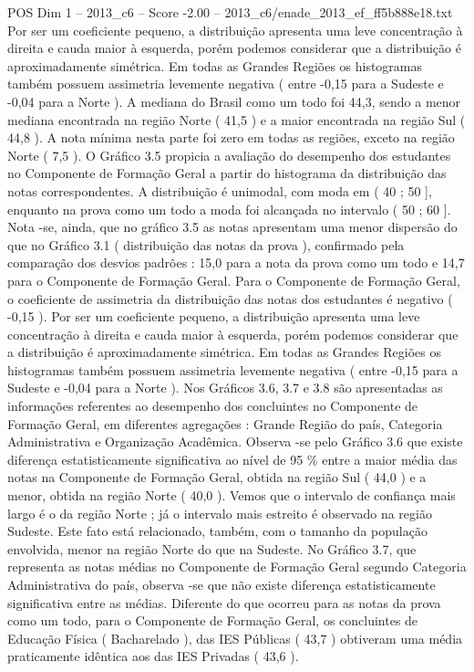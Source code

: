\begin{textsample}{POS Dim 1 – 2013\_c6 – Score -2.00 – 2013\_c6/enade\_2013\_ef\_ff5b888e18.txt}
Por ser um coeficiente pequeno, a distribuição apresenta uma leve concentração à direita e cauda maior à esquerda, porém podemos considerar que a distribuição é aproximadamente simétrica.
Em todas as Grandes Regiões os histogramas também possuem assimetria levemente negativa ( entre -0,15 para a Sudeste e -0,04 para a Norte ).
A mediana do Brasil como um todo foi 44,3, sendo a menor mediana encontrada na região Norte ( 41,5 ) e a maior encontrada na região Sul ( 44,8 ).
A nota mínima nesta parte foi zero em todas as regiões, exceto na região Norte ( 7,5 ).
O Gráfico 3.5 propicia a avaliação do desempenho dos estudantes no Componente de Formação Geral a partir do histograma da distribuição das notas correspondentes.
A distribuição é unimodal, com moda em ( 40 ; 50 ], enquanto na prova como um todo a moda foi alcançada no intervalo ( 50 ; 60 ].
Nota -se, ainda, que no gráfico 3.5 as notas apresentam uma menor dispersão do que no Gráfico 3.1 ( distribuição das notas da prova ), confirmado pela comparação dos desvios padrões : 15,0 para a nota da prova como um todo e 14,7 para o Componente de Formação Geral.
Para o Componente de Formação Geral, o coeficiente de assimetria da distribuição das notas dos estudantes é negativo ( -0,15 ).
Por ser um coeficiente pequeno, a distribuição apresenta uma leve concentração à direita e cauda maior à esquerda, porém podemos considerar que a distribuição é aproximadamente simétrica.
Em todas as Grandes Regiões os histogramas também possuem assimetria levemente negativa ( entre -0,15 para a Sudeste e -0,04 para a Norte ).
Nos Gráficos 3.6, 3.7 e 3.8 são apresentadas as informações referentes ao desempenho dos concluintes no Componente de Formação Geral, em diferentes agregações : Grande Região do país, Categoria Administrativa e Organização Acadêmica.
Observa -se pelo Gráfico 3.6 que existe diferença estatisticamente significativa ao nível de 95 \% entre a maior média das notas na Componente de Formação Geral, obtida na região Sul ( 44,0 ) e a menor, obtida na região Norte ( 40,0 ).
Vemos que o intervalo de confiança mais largo é o da região Norte ; já o intervalo mais estreito é observado na região Sudeste.
Este fato está relacionado, também, com o tamanho da população envolvida, menor na região Norte do que na Sudeste.
No Gráfico 3.7, que representa as notas médias no Componente de Formação Geral segundo Categoria Administrativa do país, observa -se que não existe diferença estatisticamente significativa entre as médias.
Diferente do que ocorreu para as notas da prova como um todo, para o Componente de Formação Geral, os concluintes de Educação Física ( Bacharelado ), das IES Públicas ( 43,7 ) obtiveram uma média praticamente idêntica aos das IES Privadas ( 43,6 ).

\end{textsample}
